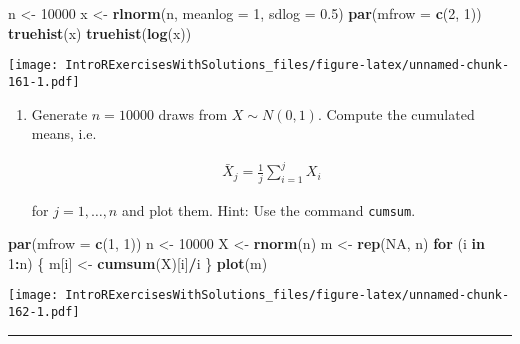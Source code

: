 \documentclass[]{article}
\newenvironment{Shaded}{\begin{snugshade}}{\end{snugshade}}
\newcommand{\KeywordTok}[1]{\textcolor[rgb]{0.13,0.29,0.53}{\textbf{#1}}}
\newcommand{\DataTypeTok}[1]{\textcolor[rgb]{0.13,0.29,0.53}{#1}}
\newcommand{\DecValTok}[1]{\textcolor[rgb]{0.00,0.00,0.81}{#1}}
\newcommand{\FloatTok}[1]{\textcolor[rgb]{0.00,0.00,0.81}{#1}}
\newcommand{\StringTok}[1]{\textcolor[rgb]{0.31,0.60,0.02}{#1}}
\newcommand{\OtherTok}[1]{\textcolor[rgb]{0.56,0.35,0.01}{#1}}
\newcommand{\ControlFlowTok}[1]{\textcolor[rgb]{0.13,0.29,0.53}{\textbf{#1}}}
\newcommand{\OperatorTok}[1]{\textcolor[rgb]{0.81,0.36,0.00}{\textbf{#1}}}
\newcommand{\NormalTok}[1]{#1}
\providecommand{\tightlist}{%
  \setlength{\itemsep}{0pt}\setlength{\parskip}{0pt}}
\begin{document}
\begin{Shaded}
\begin{Highlighting}[]
\NormalTok{n <-}\StringTok{ }\DecValTok{10000}
\NormalTok{x <-}\StringTok{ }\KeywordTok{rlnorm}\NormalTok{(n, }\DataTypeTok{meanlog =} \DecValTok{1}\NormalTok{, }\DataTypeTok{sdlog =} \FloatTok{0.5}\NormalTok{)}
\KeywordTok{par}\NormalTok{(}\DataTypeTok{mfrow =} \KeywordTok{c}\NormalTok{(}\DecValTok{2}\NormalTok{, }\DecValTok{1}\NormalTok{))}
\KeywordTok{truehist}\NormalTok{(x)}
\KeywordTok{truehist}\NormalTok{(}\KeywordTok{log}\NormalTok{(x))}
\end{Highlighting}
\end{Shaded}

\texttt{[image: IntroRExercisesWithSolutions\_files/figure-latex/unnamed-chunk-161-1.pdf]}

\begin{enumerate}
\def\labelenumi{\arabic{enumi}.}
\setcounter{enumi}{2}
\tightlist
\item
  Generate \(n=10000\) draws from \(X\sim N(0,1)\). Compute the
  cumulated means, i.e.

  \begin{align*}
  \bar{X}_{j}=\frac{1}{j}\sum_{i=1}^{j}X_{i}
  \end{align*}

  for \(j=1,\ldots ,n\) and plot them. Hint: Use the command
  \texttt{cumsum}.
\end{enumerate}

\begin{Shaded}
\begin{Highlighting}[]
\KeywordTok{par}\NormalTok{(}\DataTypeTok{mfrow =} \KeywordTok{c}\NormalTok{(}\DecValTok{1}\NormalTok{, }\DecValTok{1}\NormalTok{))}
\NormalTok{n <-}\StringTok{ }\DecValTok{10000}
\NormalTok{X <-}\StringTok{ }\KeywordTok{rnorm}\NormalTok{(n)  }
\NormalTok{m <-}\StringTok{ }\KeywordTok{rep}\NormalTok{(}\OtherTok{NA}\NormalTok{, n)}
\ControlFlowTok{for}\NormalTok{ (i }\ControlFlowTok{in} \DecValTok{1}\OperatorTok{:}\NormalTok{n) \{}
\NormalTok{    m[i] <-}\StringTok{ }\KeywordTok{cumsum}\NormalTok{(X)[i]}\OperatorTok{/}\NormalTok{i}
\NormalTok{\}}
\KeywordTok{plot}\NormalTok{(m)}
\end{Highlighting}
\end{Shaded}

\texttt{[image: IntroRExercisesWithSolutions\_files/figure-latex/unnamed-chunk-162-1.pdf]}

\begin{center}\rule{0.5\linewidth}{\linethickness}\end{center}
\end{document}

